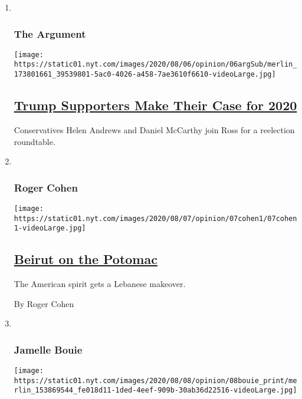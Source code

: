 \begin{enumerate}
\def\labelenumi{\arabic{enumi}.}
\item ~
  \hypertarget{the-argument}{%
  \subsubsection{The Argument}\label{the-argument}}

  \texttt{[image: https://static01.nyt.com/images/2020/08/06/opinion/06argSub/merlin\_173801661\_39539801-5ac0-4026-a458-7ae3610f6610-videoLarge.jpg]}

  \hypertarget{trump-supporters-make-their-case-for-2020}{%
  \subsection{\texorpdfstring{\href{/2020/08/06/opinion/the-argument-trump-coronavirus-election.html}{Trump
  Supporters Make Their Case for
  2020}}{Trump Supporters Make Their Case for 2020}}\label{trump-supporters-make-their-case-for-2020}}

  Conservatives Helen Andrews and Daniel McCarthy join Ross for a
  reelection roundtable.
\item ~
  \hypertarget{roger-cohen}{%
  \subsubsection{Roger Cohen}\label{roger-cohen}}

  \texttt{[image: https://static01.nyt.com/images/2020/08/07/opinion/07cohen1/07cohen1-videoLarge.jpg]}

  \hypertarget{beirut-on-the-potomac}{%
  \subsection{\texorpdfstring{\href{/2020/08/07/opinion/beirut-explosion.html}{Beirut
  on the Potomac}}{Beirut on the Potomac}}\label{beirut-on-the-potomac}}

  The American spirit gets a Lebanese makeover.

  By Roger Cohen
\item ~
  \hypertarget{jamelle-bouie}{%
  \subsubsection{Jamelle Bouie}\label{jamelle-bouie}}

  \texttt{[image: https://static01.nyt.com/images/2020/08/08/opinion/08bouie\_print/merlin\_153869544\_fe018d11-1ded-4eef-909b-30ab36d22516-videoLarge.jpg]}


\end{enumerate}

